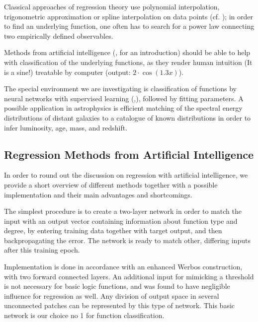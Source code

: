 \documentclass[useAMS,usenatbib]{templates/mn2e}
\begin{document}
Classical approaches of regression theory use polynomial
interpolation, trigonometric approximation or spline interpolation on
data points (cf. \cite{Quarteroni2002}); in order to find an underlying
function, one often has to search for a power law connecting two
empirically defined observables.

Methods from artificial intelligence (\cite{Laemmel2004},
\cite{Rojas1996} for an introduction) should be able to help with
classification of the underlying functions, as they render human
intuition (It is a sine!) treatable by computer (output:
$2\cdot\cos(1.3 x)$).

The special environment we are investigating is classification of
functions by neural networks with supervised learning
(\cite{Jones1990},\cite{Poggio1990}), followed by fitting
parameters. A possible application in astrophysics is efficient
matching of the spectral energy distributions of distant galaxies to a
catalogue of known distributions in order to infer luminosity, age,
mass, and redshift.

\subsection{Regression Methods from Artificial Intelligence}
In order to round out the discussion on regression with artificial
intelligence, we provide a short overview of different methods
together with a possible implementation and their main advantages and
shortcomings.

The simplest procedure is to create a two-layer network in order to
match the input with an output vector containing information about
function type and degree, by entering training data together with
target output, and then backpropagating the error. The network is
ready to match other, differing inputs after this training epoch.

Implementation is done in accordance with an enhanced Werbos
construction, with two forward connected layers. An additional input
for mimicking a threshold is not necessary for basic logic functions,
and was found to have negligible influence for regression as well. Any
division of output space in several unconnected patches can be
represented by this type of network. This basic network is our choice
no 1 for function classification.
\end{document}

